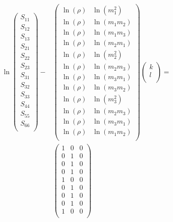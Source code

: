 \documentclass[a4paper,fleqn]{DC_ArtStyle}
\begin{document}
\begin{equation}
	\begin{split}
		\ln
		\begin{pmatrix}
			S_{11} \\
			S_{12} \\
			S_{13} \\
			S_{21} \\
			S_{22} \\
			S_{23} \\
			S_{31} \\
			S_{32} \\
			S_{33} \\
			S_{44} \\
			S_{55} \\
			S_{66} \\
		\end{pmatrix} - & \begin{pmatrix}
			\ln(\rho) & \ln(m_1^2) \\
			\ln(\rho) & \ln(m_1 m_2) \\
			\ln(\rho) & \ln(m_1 m_3) \\
			\ln(\rho) & \ln(m_2 m_1) \\
			\ln(\rho) & \ln(m_2^2) \\
			\ln(\rho) & \ln(m_2 m_3) \\
			\ln(\rho) & \ln(m_3 m_1) \\
			\ln(\rho) & \ln(m_3 m_2) \\
			\ln(\rho) & \ln(m_3^2) \\
			\ln(\rho) & \ln(m_2 m_3) \\
			\ln(\rho) & \ln(m_3 m_1) \\
			\ln(\rho) & \ln(m_1 m_2) \\
		\end{pmatrix} \begin{pmatrix}
			k \\
			l \\
		\end{pmatrix} = \\ & \begin{pmatrix}
			1 & 0 & 0 \\
			0 & 1 & 0 \\
			0 & 1 & 0 \\
			0 & 1 & 0 \\
			1 & 0 & 0 \\
			0 & 1 & 0 \\
			0 & 1 & 0 \\
			0 & 1 & 0 \\
			1 & 0 & 0 \\

\end{pmatrix}
\end{split}
\end{equation}
\end{document}
